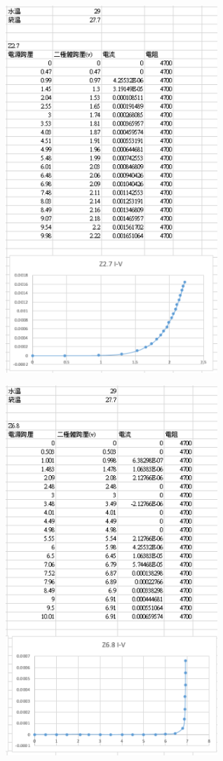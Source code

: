 \documentclass[UTF8]{ctexart}
\begin{document}
\begin{CJK*}{UTF8}{song}
\begin{minipage}[t]{0.48\textwidth}
\centering
\includegraphics[width = 0.6\textwidth]{29z27.png}
\end{minipage}
\begin{minipage}[t]{0.48\textwidth}
\centering
\includegraphics[width = 0.6\textwidth]{29z68.png}
\end{minipage}





\end{CJK*}
\end{document}
